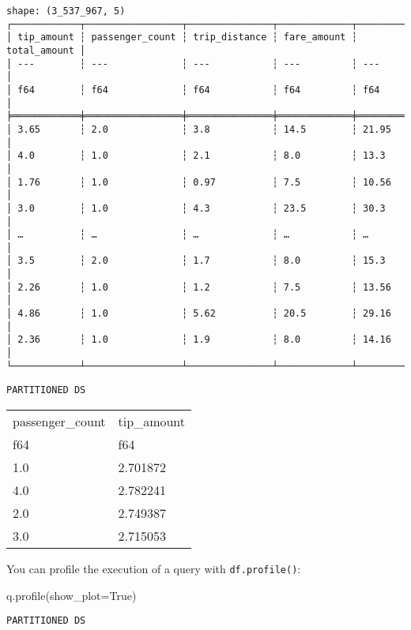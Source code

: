 \documentclass[
  letterpaper,
  DIV=11,
  numbers=noendperiod]{scrartcl}
\newenvironment{Shaded}{\begin{snugshade}}{\end{snugshade}}
\newcommand{\NormalTok}[1]{\textcolor[rgb]{0.00,0.23,0.31}{#1}}
\newcommand{\OperatorTok}[1]{\textcolor[rgb]{0.37,0.37,0.37}{#1}}
\newcommand{\VariableTok}[1]{\textcolor[rgb]{0.07,0.07,0.07}{#1}}
\begin{document}
\begin{verbatim}
shape: (3_537_967, 5)
┌────────────┬─────────────────┬───────────────┬─────────────┬──────────────┐
│ tip_amount ┆ passenger_count ┆ trip_distance ┆ fare_amount ┆ total_amount │
│ ---        ┆ ---             ┆ ---           ┆ ---         ┆ ---          │
│ f64        ┆ f64             ┆ f64           ┆ f64         ┆ f64          │
╞════════════╪═════════════════╪═══════════════╪═════════════╪══════════════╡
│ 3.65       ┆ 2.0             ┆ 3.8           ┆ 14.5        ┆ 21.95        │
│ 4.0        ┆ 1.0             ┆ 2.1           ┆ 8.0         ┆ 13.3         │
│ 1.76       ┆ 1.0             ┆ 0.97          ┆ 7.5         ┆ 10.56        │
│ 3.0        ┆ 1.0             ┆ 4.3           ┆ 23.5        ┆ 30.3         │
│ …          ┆ …               ┆ …             ┆ …           ┆ …            │
│ 3.5        ┆ 2.0             ┆ 1.7           ┆ 8.0         ┆ 15.3         │
│ 2.26       ┆ 1.0             ┆ 1.2           ┆ 7.5         ┆ 13.56        │
│ 4.86       ┆ 1.0             ┆ 5.62          ┆ 20.5        ┆ 29.16        │
│ 2.36       ┆ 1.0             ┆ 1.9           ┆ 8.0         ┆ 14.16        │
└────────────┴─────────────────┴───────────────┴─────────────┴──────────────┘
\end{verbatim}

\begin{verbatim}
PARTITIONED DS
\end{verbatim}

\begin{longtable}[]{@{}ll@{}}
\toprule()
passenger\_count & tip\_amount \\
f64 & f64 \\
\midrule()
\endhead
1.0 & 2.701872 \\
4.0 & 2.782241 \\
2.0 & 2.749387 \\
3.0 & 2.715053 \\
\bottomrule()
\end{longtable}

You can profile the execution of a query with \texttt{df.profile()}:

\begin{Shaded}
\begin{Highlighting}[]
\NormalTok{q.profile(show\_plot}\OperatorTok{=}\VariableTok{True}\NormalTok{)}
\end{Highlighting}
\end{Shaded}

\begin{verbatim}
PARTITIONED DS
\end{verbatim}
\end{document}

